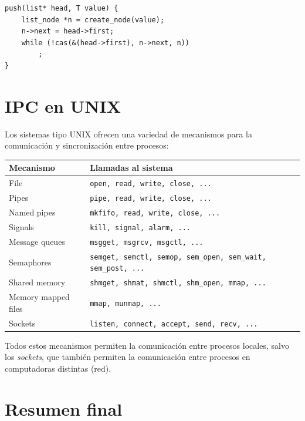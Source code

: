 \documentclass[11pt,a4paper]{article}
\begin{document}
\begin{lstlisting}[style=cstyle]
push(list* head, T value) {
    list_node *n = create_node(value);
    n->next = head->first;
    while (!cas(&(head->first), n->next, n))
        ;
}
\end{lstlisting}

\section{IPC en UNIX}

Los sistemas tipo UNIX ofrecen una variedad de mecanismos para la
comunicación y sincronización entre procesos:

\begin{center}
\small
\begin{tabular}{@{}lp{8.5cm}@{}}
\toprule
Mecanismo & Llamadas al sistema \\
\midrule
File                & \texttt{open, read, write, close, ...} \\
Pipes               & \texttt{pipe, read, write, close, ...} \\
Named pipes         & \texttt{mkfifo, read, write, close, ...} \\
Signals             & \texttt{kill, signal, alarm, ...} \\
Message queues      & \texttt{msgget, msgrcv, msgctl, ...} \\
Semaphores          & \texttt{semget, semctl, semop, sem\_open, sem\_wait, sem\_post, ...} \\
Shared memory       & \texttt{shmget, shmat, shmctl, shm\_open, mmap, ...} \\
Memory mapped files & \texttt{mmap, munmap, ...} \\
Sockets             & \texttt{listen, connect, accept, send, recv, ...} \\
\bottomrule
\end{tabular}
\end{center}

Todos estos mecanismos permiten la comunicación entre procesos
locales, salvo los \emph{sockets}, que también permiten la
comunicación entre procesos en computadoras distintas (red).

\section{Resumen final}
\end{document}
